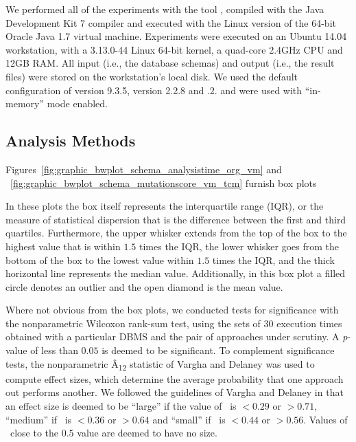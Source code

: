 We performed all of the experiments with the \SA tool \cite{Kapfhammer2013,McMinn2015,Wright2014}, compiled with the Java Development Kit 7 compiler and executed with the Linux version of the 64-bit Oracle Java 1.7 virtual machine.  Experiments were executed on an Ubuntu 14.04 workstation, with a 3.13.0-44 Linux 64-bit kernel, a quad-core 2.4GHz CPU and 12GB RAM. All input (i.e., the database schemas) and output (i.e., the result files) were stored on the workstation's local disk. We used the default configuration of \PostgreSQL version 9.3.5, \HyperSQL version 2.2.8 and .2.  \HyperSQL and \SQLite were used with ``in-memory'' mode enabled.

\subsection{Analysis Methods}
\label{sec:analysis-methods}

Figures~\ref{fig:graphic_bwplot_schema_analysistime_org_vm} and ~\ref{fig:graphic_bwplot_schema_mutationscore_vm_tcm}
furnish box plots 

In these plots the box itself represents the interquartile range (IQR), or the measure of statistical dispersion that is
the difference between the first and third quartiles. Furthermore, the upper whisker extends from the top of the box to
the highest value that is within $1.5$ times the IQR, the lower whisker goes from the bottom of the box to the lowest
value within $1.5$ times the IQR, and the thick horizontal line represents the median value.  Additionally, in this box
plot a filled circle denotes an outlier and the open diamond is the mean value.


Where not obvious from the box plots, we conducted tests for significance with the nonparametric Wilcoxon rank-sum test,
using the sets of 30 execution times obtained with a particular DBMS and the pair of approaches under scrutiny.  A {\it
p}-value of less than $0.05$ is deemed to be significant.  To complement significance tests, the nonparametric
\^{A}\textsubscript{12} statistic of Vargha and Delaney \cite{Vargha2000} was used to compute effect sizes, which
determine the average probability that one approach out performs another.  We followed the guidelines of Vargha and
Delaney in that an effect size is deemed to be ``large'' if the value of \atwelve~is $< 0.29$ or $> 0.71$, ``medium'' if
\atwelve~is $< 0.36$ or $> 0.64$ and ``small'' if \atwelve~is $< 0.44$ or $> 0.56$.  Values of \atwelve~close to the
$0.5$ value are deemed to have no size.


